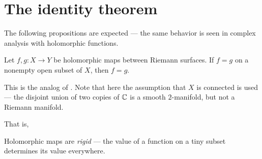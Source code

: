 \section{The identity theorem}

The following propositions are expected --- the same behavior is seen in complex analysis with
holomorphic functions.

\begin{theorem}
	Let $f, g \colon X \to Y$ be holomorphic maps between Riemann surfaces. If $f = g$ on a nonempty
	open subset of $X$, then $f = g$.
\end{theorem}
This is the analog of . Note that here the assumption that $X$ is connected
is used --- the disjoint union of two copies of $\mathbb C$ is a smooth $2$-manifold, but not a Riemann
manifold.

That is,
\begin{moral}
	Holomorphic maps are \emph{rigid} --- the value of a function on a tiny subset determines its
	value everywhere.
\end{moral}


